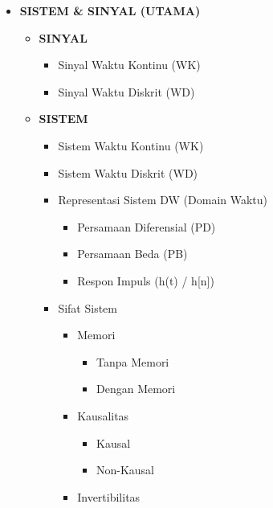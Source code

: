 \documentclass[
  letterpaper,
  DIV=11,
  numbers=noendperiod]{scrreprt}
\providecommand{\tightlist}{%
  \setlength{\itemsep}{0pt}\setlength{\parskip}{0pt}}
\begin{document}
\begin{itemize}
\tightlist
\item
  \textbf{SISTEM \& SINYAL (UTAMA)}

  \begin{itemize}
  \tightlist
  \item
    \textbf{SINYAL}

    \begin{itemize}
    \tightlist
    \item
      Sinyal Waktu Kontinu (WK)
    \item
      Sinyal Waktu Diskrit (WD)
    \end{itemize}
  \item
    \textbf{SISTEM}

    \begin{itemize}
    \tightlist
    \item
      Sistem Waktu Kontinu (WK)
    \item
      Sistem Waktu Diskrit (WD)
    \item
      Representasi Sistem DW (Domain Waktu)

      \begin{itemize}
      \tightlist
      \item
        Persamaan Diferensial (PD)
      \item
        Persamaan Beda (PB)
      \item
        Respon Impuls (h(t) / h{[}n{]})
      \end{itemize}
    \item
      Sifat Sistem

      \begin{itemize}
      \tightlist
      \item
        Memori

        \begin{itemize}
        \tightlist
        \item
          Tanpa Memori
        \item
          Dengan Memori
        \end{itemize}
      \item
        Kausalitas

        \begin{itemize}
        \tightlist
        \item
          Kausal
        \item
          Non-Kausal
        \end{itemize}
      \item
        Invertibilitas


\end{itemize}
\end{itemize}
\end{itemize}
\end{itemize}
\end{document}
